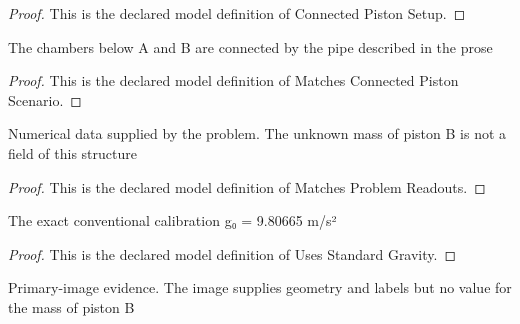 \begin{proof}
  This is the declared model definition of Connected Piston Setup.
\end{proof}
\begin{definition}
  \label{def:physics:phyx-mini-0390:phyxminiproblems-problemphyxmini0390-matchesconnectedpistonscenario}
  The chambers below A and B are connected by the pipe described in the prose
\end{definition}
\begin{proof}
  This is the declared model definition of Matches Connected Piston Scenario.
\end{proof}
\begin{definition}
  \label{def:physics:phyx-mini-0390:phyxminiproblems-problemphyxmini0390-matchesproblemreadouts}
  Numerical data supplied by the problem. The unknown mass of piston B is not a field of this structure
\end{definition}
\begin{proof}
  This is the declared model definition of Matches Problem Readouts.
\end{proof}
\begin{definition}
  \label{def:physics:phyx-mini-0390:phyxminiproblems-problemphyxmini0390-usesstandardgravity}
  The exact conventional calibration g₀ = 9.80665 m/s²
\end{definition}
\begin{proof}
  This is the declared model definition of Uses Standard Gravity.
\end{proof}
\begin{definition}
  \label{def:physics:phyx-mini-0390:phyxminiproblems-problemphyxmini0390-matchessuppliedconnectedpistonfigure}
  Primary-image evidence. The image supplies geometry and labels but no value for the mass of piston B
\end{definition}
